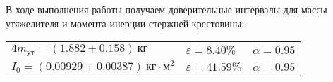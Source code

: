 В ходе выполнения работы получаем доверительные интервалы для массы утяжелителя и момента инерции стержней крестовины:

\begin{tabular}{lll}
    $4m_\text{ут} = (1.882 \pm 0.158) \ \text{кг}$ & $\varepsilon = 8.40\%$ & $\alpha = 0.95$ \\

    $I_0 = (0.00929 \pm 0.00387) \ \text{кг} \cdot \text{м}^2$ & $\varepsilon = 41.59\%$ & $\alpha = 0.95$ \\
\end{tabular}